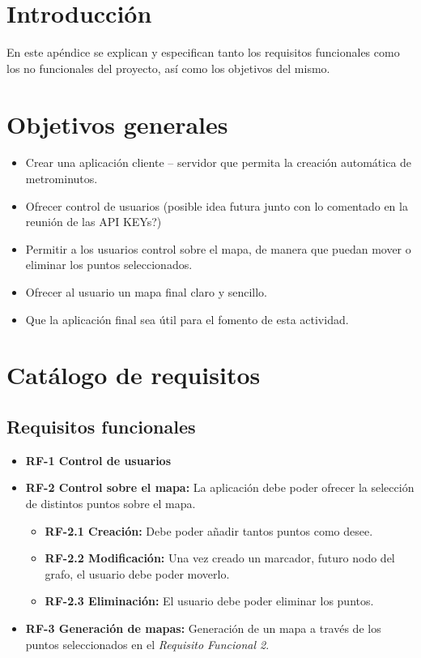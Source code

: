 
\section{Introducción}
En este apéndice se explican y especifican tanto los requisitos funcionales como los no funcionales del proyecto, así como los objetivos del mismo.

\section{Objetivos generales}

\begin{itemize}
	\item Crear una aplicación cliente -- servidor que permita la creación automática de metrominutos.
    \item Ofrecer control de usuarios (posible idea futura junto con lo comentado en la reunión de las API KEYs?)
    \item Permitir a los usuarios control sobre el mapa, de manera que puedan mover o eliminar los puntos seleccionados.
    \item Ofrecer al usuario un mapa final claro y sencillo.
    \item Que la aplicación final sea útil para el fomento de esta actividad.
\end{itemize}

\section{Catálogo de requisitos}

\subsection{Requisitos funcionales}
\begin{itemize}
	\item \textbf{RF-1 Control de usuarios}
	\item \textbf{RF-2 Control sobre el mapa:} La aplicación debe poder ofrecer la selección de distintos puntos sobre el mapa.
	\begin{itemize}
		\item \textbf{RF-2.1 Creación:} Debe poder añadir tantos puntos como desee.
		\item \textbf{RF-2.2 Modificación:} Una vez creado un marcador, futuro nodo del grafo, el usuario debe poder moverlo.
		\item \textbf{RF-2.3 Eliminación:} El usuario debe poder eliminar los puntos.
	\end{itemize}
	\item \textbf{RF-3 Generación de mapas:} Generación de un mapa a través de los puntos seleccionados en el \textit{Requisito Funcional 2}.
\end{itemize}


